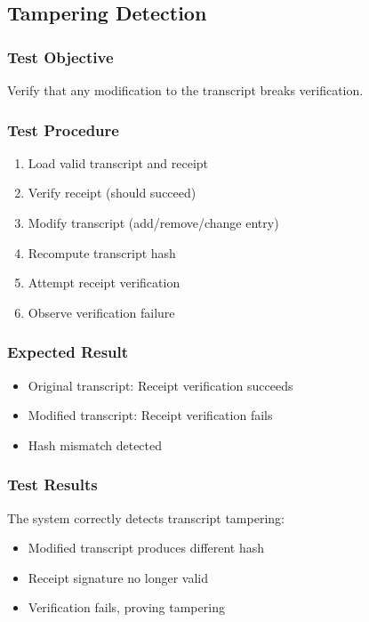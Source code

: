 \documentclass[runningheads]{llncs}
\begin{document}
\subsection{Tampering Detection}

\subsubsection{Test Objective}

Verify that any modification to the transcript breaks verification.

\subsubsection{Test Procedure}

\begin{enumerate}
    \item Load valid transcript and receipt
    \item Verify receipt (should succeed)
    \item Modify transcript (add/remove/change entry)
    \item Recompute transcript hash
    \item Attempt receipt verification
    \item Observe verification failure
\end{enumerate}

\subsubsection{Expected Result}

\begin{itemize}
    \item Original transcript: Receipt verification succeeds
    \item Modified transcript: Receipt verification fails
    \item Hash mismatch detected
\end{itemize}

\subsubsection{Test Results}

The system correctly detects transcript tampering:
\begin{itemize}
    \item Modified transcript produces different hash
    \item Receipt signature no longer valid
    \item Verification fails, proving tampering
\end{itemize}
\end{document}
